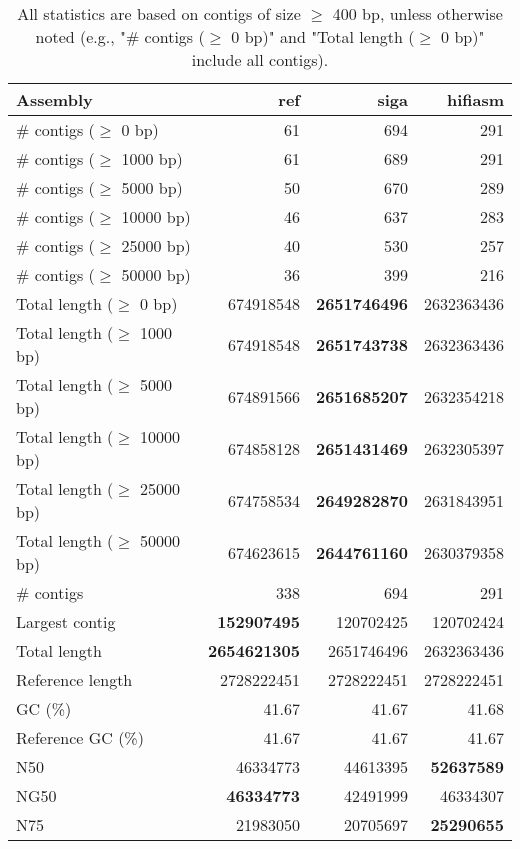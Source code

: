 \documentclass[12pt,a4paper]{article}
\begin{document}
\begin{table}[ht]
\begin{center}
\caption{All statistics are based on contigs of size $\geq$ 400 bp, unless otherwise noted (e.g., "\# contigs ($\geq$ 0 bp)" and "Total length ($\geq$ 0 bp)" include all contigs).}
\begin{tabular}{|l*{3}{|r}|}
\hline
Assembly & ref & siga & hifiasm \\ \hline
\# contigs ($\geq$ 0 bp) & 61 & 694 & 291 \\ \hline
\# contigs ($\geq$ 1000 bp) & 61 & 689 & 291 \\ \hline
\# contigs ($\geq$ 5000 bp) & 50 & 670 & 289 \\ \hline
\# contigs ($\geq$ 10000 bp) & 46 & 637 & 283 \\ \hline
\# contigs ($\geq$ 25000 bp) & 40 & 530 & 257 \\ \hline
\# contigs ($\geq$ 50000 bp) & 36 & 399 & 216 \\ \hline
Total length ($\geq$ 0 bp) & 674918548 & {\bf 2651746496} & 2632363436 \\ \hline
Total length ($\geq$ 1000 bp) & 674918548 & {\bf 2651743738} & 2632363436 \\ \hline
Total length ($\geq$ 5000 bp) & 674891566 & {\bf 2651685207} & 2632354218 \\ \hline
Total length ($\geq$ 10000 bp) & 674858128 & {\bf 2651431469} & 2632305397 \\ \hline
Total length ($\geq$ 25000 bp) & 674758534 & {\bf 2649282870} & 2631843951 \\ \hline
Total length ($\geq$ 50000 bp) & 674623615 & {\bf 2644761160} & 2630379358 \\ \hline
\# contigs & 338 & 694 & 291 \\ \hline
Largest contig & {\bf 152907495} & 120702425 & 120702424 \\ \hline
Total length & {\bf 2654621305} & 2651746496 & 2632363436 \\ \hline
Reference length & 2728222451 & 2728222451 & 2728222451 \\ \hline
GC (\%) & 41.67 & 41.67 & 41.68 \\ \hline
Reference GC (\%) & 41.67 & 41.67 & 41.67 \\ \hline
N50 & 46334773 & 44613395 & {\bf 52637589} \\ \hline
NG50 & {\bf 46334773} & 42491999 & 46334307 \\ \hline
N75 & 21983050 & 20705697 & {\bf 25290655} \\ \hline

\end{tabular}
\end{center}
\end{table}
\end{document}

